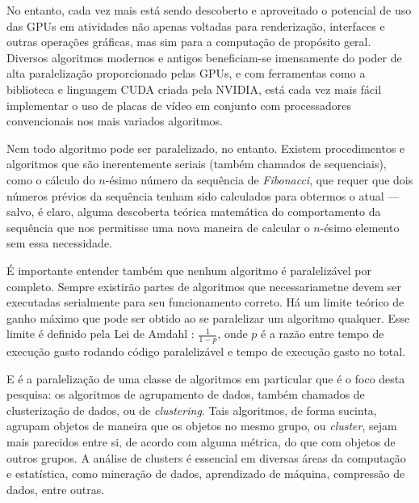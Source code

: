 \documentclass[12pt, %
openright, 
oneside, %
a4paper,    %
brazil]{facom-ufu-abntex2}
\begin{document}
No entanto, cada vez mais está sendo descoberto e aproveitado o potencial de uso das GPUs em atividades não apenas voltadas para renderização, interfaces e outras operações gráficas, mas sim para a computação de propósito geral. Diversos algoritmos modernos e antigos beneficiam-se imensamente do poder de alta paralelização proporcionado pelas GPUs, e com ferramentas como a biblioteca e linguagem CUDA criada pela NVIDIA, está cada vez mais fácil implementar o uso de placas de vídeo em conjunto com processadores convencionais nos mais variados algoritmos.

Nem todo algoritmo pode ser paralelizado, no entanto. Existem procedimentos e algoritmos que são inerentemente seriais (também chamados de sequenciais), como o cálculo do $n$-ésimo número da sequência de \textit{Fibonacci}, que requer que dois números prévios da sequência tenham sido calculados para obtermos o atual --- salvo, é claro, alguma descoberta teórica matemática do comportamento da sequência que nos permitisse uma nova maneira de calcular o $n$-ésimo elemento sem essa necessidade.

É importante entender também que nenhum algoritmo é paralelizável por completo. Sempre existirão partes de algoritmos que necessariametne devem ser executadas serialmente para seu funcionamento correto. Há um limite teórico de ganho máximo que pode ser obtido ao se paralelizar um algoritmo qualquer. Esse limite é definido pela Lei de Amdahl \cite{Amdahl-Law}: $\frac{1}{1-p}$, onde $p$ é a razão entre tempo de execução gasto rodando código paralelizável e tempo de execução gasto no total.


E é a paralelização de uma classe de algoritmos em particular que é o foco desta pesquisa: os algoritmos de agrupamento de dados, também chamados de clusterização de dados, ou de \textit{clustering}. Tais algoritmos, de forma sucinta, agrupam objetos de maneira que os objetos no mesmo grupo, ou \textit{cluster}, sejam mais parecidos entre si, de acordo com alguma métrica, do que com objetos de outros grupos. A análise de clusters é essencial em diversas áreas da computação e estatística, como mineração de dados, aprendizado de máquina, compressão de dados, entre outras.
\end{document}
